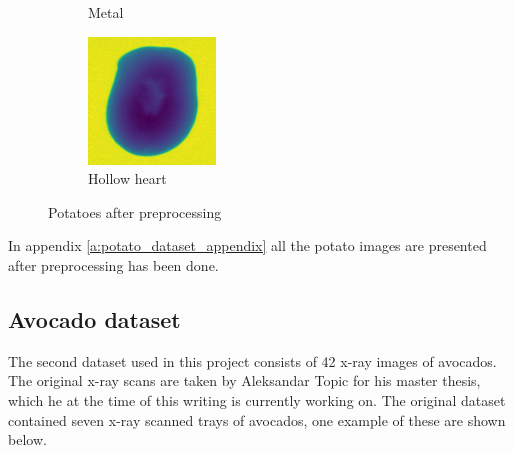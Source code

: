 \documentclass[11pt]{article}
\begin{document}
\begin{figure}[!h]
\begin{subfigure}[b]{0.25\textwidth}
        \caption{Metal}
         \label{fig:data_potato_metal}
     \end{subfigure}
     \hfill
     \begin{subfigure}[b]{0.25\textwidth}
         \centering
         \includegraphics[width=\textwidth]{figurer/data/hollow_0.jpg}
         \caption{Hollow heart}
         \label{fig:data_potato_hollow}
     \end{subfigure}
    \caption{Potatoes after preprocessing}
        \label{fig:data_potato}
\end{figure}

In appendix \ref{a:potato_dataset_appendix} all the potato images are presented after preprocessing has been done.


\subsection{Avocado dataset}

The second dataset used in this project consists of 42 x-ray images of avocados. The original x-ray scans are taken by Aleksandar Topic for his master thesis, which he at the time of this writing is currently working on. The original dataset contained seven x-ray scanned trays of avocados, one example of these are shown below.
\end{document}
